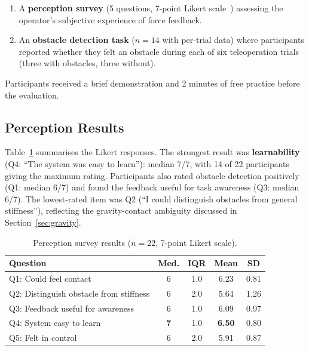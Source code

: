 \documentclass[conference]{IEEEtran}
\begin{document}
\begin{enumerate}
    \item A \textbf{perception survey} (5 questions, 7-point Likert scale~\cite{preston2000}) assessing the operator's subjective experience of force feedback.
    \item An \textbf{obstacle detection task} ($n = 14$ with per-trial data) where participants reported whether they felt an obstacle during each of six teleoperation trials (three with obstacles, three without).
\end{enumerate}

Participants received a brief demonstration and 2 minutes of free practice before the evaluation.

\subsection{Perception Results}

Table~\ref{fig:survey} summarises the Likert responses. The strongest result was \textbf{learnability} (Q4: ``The system was easy to learn''): median 7/7, with 14 of 22 participants giving the maximum rating. Participants also rated obstacle detection positively (Q1: median 6/7) and found the feedback useful for task awareness (Q3: median 6/7). The lowest-rated item was Q2 (``I could distinguish obstacles from general stiffness''), reflecting the gravity-contact ambiguity discussed in Section~\ref{sec:gravity}.

\begin{table}[t]
    \centering
    \caption{Perception survey results ($n = 22$, 7-point Likert scale).}
    \label{fig:survey}
    \small
    \begin{tabular}{@{}lcccc@{}}
        \toprule
        \textbf{Question} & \textbf{Med.} & \textbf{IQR} & \textbf{Mean} & \textbf{SD} \\
        \midrule
        Q1: Could feel contact & 6 & 1.0 & 6.23 & 0.81 \\
        Q2: Distinguish obstacle from stiffness & 6 & 2.0 & 5.64 & 1.26 \\
        Q3: Feedback useful for awareness & 6 & 1.0 & 6.09 & 0.97 \\
        Q4: System easy to learn & \textbf{7} & 1.0 & \textbf{6.50} & 0.80 \\
        Q5: Felt in control & 6 & 2.0 & 5.91 & 0.87 \\
        \bottomrule
    \end{tabular}
\end{table}
\end{document}
